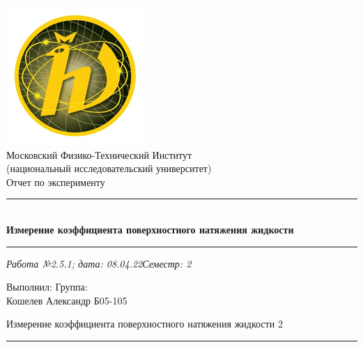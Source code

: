 \documentclass[12pt,a4paper]{scrartcl}
\begin{document}
	\begin{titlepage}
		
		\vspace*{\fill}
		
		\begin{center}
			\includegraphics[scale=0.8]{MIPT.png}
			\\[0.7cm]\Huge Московский Физико-Технический Институт\\(национальный исследовательский университет)
			\\[2cm]\LARGE Отчет по эксперименту
			\\[0.5cm]\noindent\rule{\textwidth}{1pt}
			\\\Huge\textbf{Измерение коэффициента поверхностного натяжения жидкости}
			\\[-0.5cm]\noindent\rule{\textwidth}{1pt}
		\end{center}
		
		\begin{flushleft}
			\textit{Работа №2.5.1; дата: 08.04.22}\hfill\textit{Семестр: 2}
		\end{flushleft}
		
		\vspace*{\fill}
		
		\begin{flushleft}
			Выполнил: \hspace{\fill} Группа:
			\\Кошелев Александр \hspace{\fill} Б05-105
		\end{flushleft}
	\end{titlepage}
	
	
	\begin{flushleft}
		\footnotesize{Измерение коэффициента поверхностного натяжения жидкости} \hspace{\fill} \footnotesize{2}
		\\[-0.3cm]\noindent\rule{\textwidth}{0.3pt}
	\end{flushleft}
	
\end{document}
